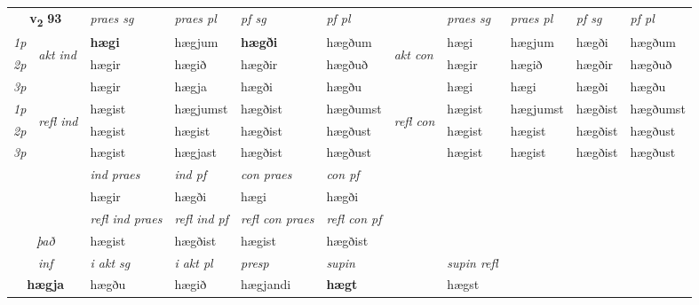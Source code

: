 \noindent
\begin{tabular}{lllllllllll} \toprule
\multicolumn{2}{c}{\textbf{v{\textsubscript{2}}} \Large{\textbf{93}}}  &  \textit{praes sg}  & \textit{praes pl}  &\textit{ pf sg} & \textit{pf pl} &  &  \textit{praes sg}  & \textit{praes pl}  & \textit{pf sg} & \textit{pf pl } \\*
	\cmidrule{3-6} \cmidrule{8-11}
 {\textit{1p}} & \multirow{3}{*}{\begin{turn}{90}\textit{akt ind}\end{turn}} & \textbf{hægi} & hægjum & \textbf{hægði} & hægðum & \multirow{3}{*}{\begin{turn}{90}\textit{akt con}\end{turn}} &hægi & hægjum & hægði & hægðum\\*
 {\textit{2p}} &  &  hægir  & hægið & hægðir & hægðuð & & hægir & hægið & hægðir & hægðuð \\*
{\textit{3p}} &  & hægir & hægja & hægði & hægðu & & hægi & hægi& hægði & hægðu \\*
\cmidrule{3-6} \cmidrule{8-11}
 {\textit{1p}} & \multirow{3}{*}{\begin{turn}{90}\textit{refl ind}\end{turn}}  & hægist & hægjumst & hægðist & hægðumst & \multirow{3}{*}{\begin{turn}{90}\textit{refl con}\end{turn}}  &hægist & hægjumst & hægðist & hægðumst \\*
 {\textit{2p}} &  & hægist & hægist & hægðist & hægðust & &hægist & hægist & hægðist & hægðust \\*
 {\textit{3p}}  & & hægist & hægjast & hægðist & hægðust & & hægist & hægist& hægðist & hægðust \\*
\cmidrule{3-6} \cmidrule{8-11}

   & &  \textit{ind praes} & \textit{ind pf} & \textit{con praes} & \textit{con pf} \\*
\multicolumn{2}{c}{ \textit{\specialcell{e-m\\það}} } & hægir & hægði & hægi & hægði \\*

\cmidrule{3-6}
 & & \textit{refl ind praes} & \textit{refl ind pf} & \textit{refl con praes} & \textit{refl con pf} \\*
 \multicolumn{2}{c}{ \textit{það} }& hægist & hægðist & hægist & hægðist \\*

\cmidrule{3-8}
   \multicolumn{2}{c}{\textit{inf}}  & \textit{i akt sg} & \textit{i akt pl}   & \textit{presp} & \textit{supin} && \textit{supin refl}  \\*
  \multicolumn{2}{c}{\textbf{hægja}} & hægðu  & hægið   & hægjandi &  \textbf{hægt} && hægst  \\*
\end{tabular}

